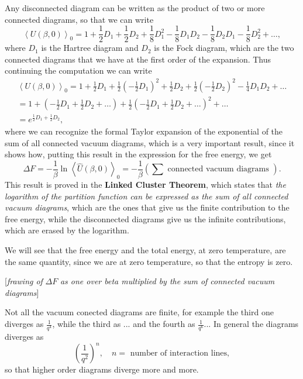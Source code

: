 Any disconnected diagram can be written as the product of two or more connected diagrams, so that we can write
\[
    \left\langle U(\beta, 0) \right\rangle_0 = 1 + \frac{1}{2} D_1 + \frac{1}{2} D_2 + \frac{1}{8} D_1^2 - \frac{1}{8} D_1 D_2 - \frac{1}{8} D_2 D_1 - \frac{1}{8} D_2^2 + \dots,
\]
where \(D_1\) is the Hartree diagram and \(D_2\) is the Fock diagram, which are the two connected diagrams that we have at the first order of the expansion. Thus continuing the computation we can write
\[
    \begin{aligned}
        \left\langle U(\beta,0) \right\rangle_0 = 1 + \frac{1}{2} D_1 + \frac{1}{2}(-\frac{1}{2}D_1)^2 + \frac{1}{2} D_2 + \frac{1}{2}(-\frac{1}{2}D_2)^2 - \frac{1}{4} D_1 D_2 + \dots \\
        = 1 + (-\frac{1}{2} D_1 + \frac{1}{2}D_2 + \dots) + \frac{1}{2}(-\frac{1}{2} D_1 + \frac{1}{2} D_2 + \dots)^2 + \dots                                                           \\
        = e^{\frac{1}{2} D_1 + \frac{1}{2} D_2},
    \end{aligned}
\]
where we can recognize the formal Taylor expansion of the exponential of the sum of all connected vacuum diagrams, which is a very important result, since it shows how, putting this result in the expression for the free energy, we get
\[
    \Delta F = - \frac{1}{\beta} \ln \left\langle \hat{U}(\beta, 0) \right\rangle_0 = - \frac{1}{\beta} \left(\sum \text{ connected vacuum diagrams } \right).
\]
This result is proved in the \textbf{Linked Cluster Theorem}, which states that \textit{the logarithm of the partition function can be expressed as the sum of all connected vacuum diagrams}, which are the ones that give us the finite contribution to the free energy, while the disconnected diagrams give us the infinite contributions, which are erased by the logarithm.

We will see that the free energy and the total energy, at zero temperature, are the same quantity, since we are at zero temperature, so that the entropy is zero.

    [\textit{frawing of} \(\Delta F\) \textit{as one over beta multiplied by the sum of connected vacuum diagrams}]

Not all the vacuum conected diagrams are finite, for example the third one diverges as \(\frac{1}{q^4}\), while the third as ... and the fourth as \(\frac{1}{q^6}\)... In general the diagrams diverges as
\[
    \left(\frac{1}{q^2}\right)^n, \quad n = \text{ number of interaction lines},
\]
so that higher order diagrams diverge more and more.

